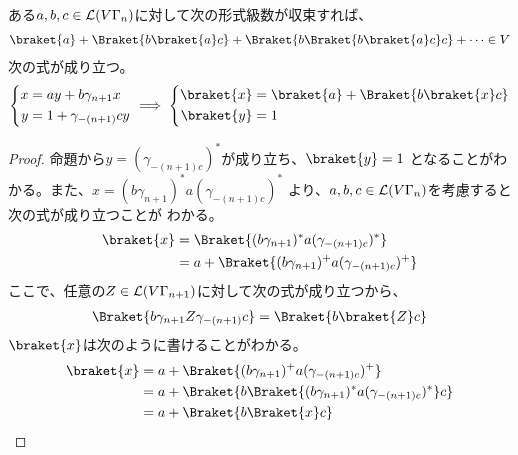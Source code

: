 {	\begin{observation}[文脈自由文法の線形化その二]
	\label{obs:文脈自由文法の線形化その二} %
		ある$a,b,c\in\mathcal{L}(V\Gamma_n)$に対して次の形式級数が収束すれば、
		\begin{equation*}\begin{split}
			\braket{a} + \Braket{b\braket{a}c} + \Braket{b\Braket{b\braket{a}c}c}
				+ \cdots \in V\\
		\end{split}\end{equation*}
		次の式が成り立つ。
		\begin{equation*}\begin{split}
			\left\{\begin{split}
				x &= ay + b\gamma_{n+1}x \\
				y &= 1 + \gamma_{-(n+1)}cy \\
			\end{split}\right.\implies \left\{\begin{split}
				\braket{x} &= \braket{a} + \Braket{b\braket{x}c} \\
				\braket{y} &= 1 \\
			\end{split}\right.
		\end{split}\end{equation*}
	\end{observation} %
	\begin{proof} %
		命題から$y=(\gamma_{-(n+1)c})^*$が成り立ち、$\braket{y}=1$
		となることがわかる。また、$x=(b\gamma_{n+1})^*a(\gamma_{-(n+1)c})^*$
		より、$a,b,c\in \mathcal{L}(V\Gamma_n)$を考慮すると次の式が成り立つことが
		わかる。
		\begin{equation*}\begin{split}
			\braket{x} &= \Braket{(b\gamma_{n+1})^*a(\gamma_{-(n+1)c})^*} \\
			&= a + \Braket{(b\gamma_{n+1})^+a(\gamma_{-(n+1)c})^+} \\
		\end{split}\end{equation*}
		ここで、任意の$Z\in\mathcal{L}(V\Gamma_{n+1})$に対して次の式が成り立つから、
		\begin{equation*}\begin{split}
			\Braket{b\gamma_{n+1}Z\gamma_{-(n+1)}c} = \Braket{b\braket{Z}c}
		\end{split}\end{equation*}
		$\braket{x}$は次のように書けることがわかる。
		\begin{equation*}\begin{split}
			\braket{x}
			&= a + \Braket{(b\gamma_{n+1})^+a(\gamma_{-(n+1)c})^+} \\
			&= a + \Braket{b\Braket{(b\gamma_{n+1})^*a(\gamma_{-(n+1)c})^*}c} \\
			&= a + \Braket{b\Braket{x}c} \\
		\end{split}\end{equation*}
	\end{proof} %

}
